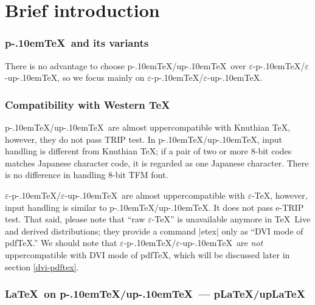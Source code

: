 \documentclass[a4paper,11pt]{article}
\def\epTeX{$\varepsilon$-\pTeX}\def\eTeX{$\varepsilon$-\TeX}
\def\eupTeX{$\varepsilon$-\upTeX}\def\upTeX{u\pTeX}
\def\pTeX{p\kern-.10em\TeX}
\def\pLaTeX{p\LaTeX}\def\upLaTeX{u\pLaTeX}
\def\pdfTeX{pdf\TeX}
\begin{document}
\tableofcontents


\newpage


\part{Brief introduction}%

\section{\pTeX\ and its variants}


There is no advantage to choose \pTeX/\upTeX\ over \epTeX/\eupTeX,
so we focus mainly on \epTeX/\eupTeX.


\section{Compatibility with Western \TeX}

\pTeX/\upTeX\ are almost uppercompatible with Knuthian \TeX,
however, they do not pass TRIP test.
In \pTeX/\upTeX, input handling is different from Knuthian \TeX;
if a pair of two or more 8-bit codes matches Japanese character code,
it is regarded as one Japanese character.
There is no difference in handling 8-bit TFM font.

\epTeX/\eupTeX\ are almost uppercompatible with \eTeX,
however, input handling is similar to \pTeX/\upTeX.
It does not pass e-TRIP test.
That said, please note that ``raw \eTeX'' is unavailable anymore
in \TeX\ Live and derived distributions;
they provide a command |etex| only as ``DVI mode of \pdfTeX.''
We should note that
\epTeX/\eupTeX\ are {\em not} uppercompatible with DVI mode of \pdfTeX,
which will be discussed later in section \ref{dvi-pdftex}.

\section{\LaTeX\ on \pTeX/\upTeX\ --- \pLaTeX/\upLaTeX}
\end{document}
